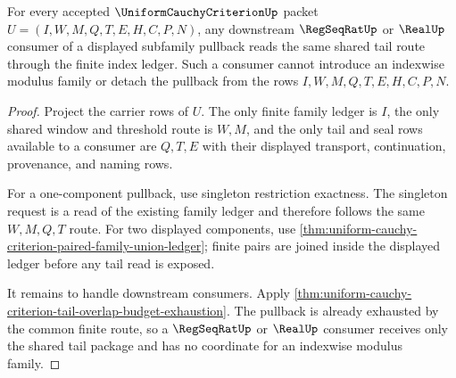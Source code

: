 \begin{theorem}
\label{thm:uniform-cauchy-criterion-shared-tail-subfamily-pullback}
For every accepted $\UniformCauchyCriterionUp$ packet $U=(I,W,M,Q,T,E,H,C,P,N)$, any downstream $\RegSeqRatUp$ or $\RealUp$ consumer of a displayed subfamily pullback reads the same shared tail route through the finite index ledger. Such a consumer cannot introduce an indexwise modulus family or detach the pullback from the rows $I,W,M,Q,T,E,H,C,P,N$.
\end{theorem}
\begin{proof}
Project the carrier rows of $U$. The only finite family ledger is $I$, the only shared window and threshold route is $W,M$, and the only tail and seal rows available to a consumer are $Q,T,E$ with their displayed transport, continuation, provenance, and naming rows.

For a one-component pullback, use singleton restriction exactness. The singleton request is a read of the existing family ledger and therefore follows the same $W,M,Q,T$ route. For two displayed components, use \autoref{thm:uniform-cauchy-criterion-paired-family-union-ledger}; finite pairs are joined inside the displayed ledger before any tail read is exposed.

It remains to handle downstream consumers. Apply \autoref{thm:uniform-cauchy-criterion-tail-overlap-budget-exhaustion}. The pullback is already exhausted by the common finite route, so a $\RegSeqRatUp$ or $\RealUp$ consumer receives only the shared tail package and has no coordinate for an indexwise modulus family.
\end{proof}

